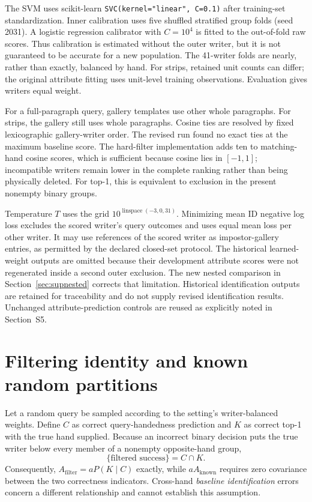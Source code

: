 \documentclass[10pt,a4paper]{article}
\begin{document}
The SVM uses scikit-learn \texttt{SVC(kernel="linear", C=0.1)} after training-set standardization. Inner calibration uses five shuffled stratified group folds (seed 2031). A logistic regression calibrator with $C=10^4$ is fitted to the out-of-fold raw scores. Thus calibration is estimated without the outer writer, but it is not guaranteed to be accurate for a new population. The 41-writer folds are nearly, rather than exactly, balanced by hand. For strips, retained unit counts can differ; the original attribute fitting uses unit-level training observations. Evaluation gives writers equal weight.

For a full-paragraph query, gallery templates use other whole paragraphs. For strips, the gallery still uses whole paragraphs. Cosine ties are resolved by fixed lexicographic gallery-writer order. The revised run found no exact ties at the maximum baseline score. The hard-filter implementation adds ten to matching-hand cosine scores, which is sufficient because cosine lies in $[-1,1]$; incompatible writers remain lower in the complete ranking rather than being physically deleted. For top-1, this is equivalent to exclusion in the present nonempty binary groups.

Temperature $T$ uses the grid $10^{\operatorname{linspace}(-3,0,31)}$. Minimizing mean ID negative log loss excludes the scored writer's query outcomes and uses equal mean loss per other writer. It may use references of the scored writer as impostor-gallery entries, as permitted by the declared closed-set protocol. The historical learned-weight outputs are omitted because their development attribute scores were not regenerated inside a second outer exclusion. The new nested comparison in Section~\ref{sec:supnested} corrects that limitation. Historical identification outputs are retained for traceability and do not supply revised identification results. Unchanged attribute-prediction controls are reused as explicitly noted in Section~S5.

\section{Filtering identity and known random partitions}
Let a random query be sampled according to the setting's writer-balanced weights. Define $C$ as correct query-handedness prediction and $K$ as correct top-1 with the true hand supplied. Because an incorrect binary decision puts the true writer below every member of a nonempty opposite-hand group,
\[
\{\text{filtered success}\}=C\cap K.
\]
Consequently, $A_{\mathrm{filter}}=aP(K\mid C)$ exactly, while $aA_{\mathrm{known}}$ requires zero covariance between the two correctness indicators. Cross-hand \emph{baseline identification} errors concern a different relationship and cannot establish this assumption.
\end{document}
